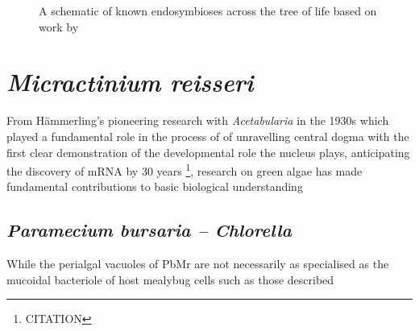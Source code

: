 \begin{figure}
    \caption{A schematic of known endosymbioses across the tree of life based on work by \citep{Gribaldo2010,Wrede2012,vonDohlen2001}}
\end{figure}
%
%
%
%
%


\section{\textit{Micractinium reisseri}}
From H\"ammerling's pioneering research with \textit{Acetabularia} in the 1930s 
which played a fundamental role in the process of 
of unravelling central dogma with the first clear demonstration of the 
developmental role the nucleus plays, anticipating the discovery of mRNA by 30 years
\footnote{CITATION}, research on green algae has made fundamental contributions
to basic biological understanding

\subsection{\textit{Paramecium bursaria – Chlorella}}

While the perialgal vacuoles of PbMr are not necessarily as specialised as the 
mucoidal bacteriole of host mealybug cells such as those described \citep{vonDohlen2001}

